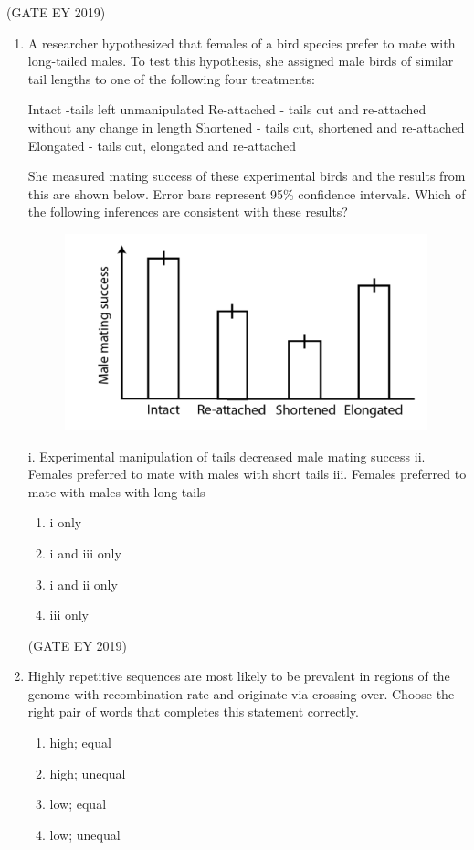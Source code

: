 \documentclass[journal,12pt,onecolumn]{IEEEtran}
\theoremstyle{remark}
\begin{document}
\hfill{(GATE EY 2019)}
\begin{enumerate}[resume]

\item A researcher hypothesized that females of a bird species prefer to mate with long-tailed males. To test this hypothesis, she assigned male birds of similar tail lengths to one of the following four treatments:  

 Intact -tails left unmanipulated  
 Re-attached - tails cut and re-attached without any change in length  
 Shortened - tails cut, shortened and re-attached  
 Elongated - tails cut, elongated and re-attached  

She measured mating success of these experimental birds and the results from this are shown below. Error bars represent 95\% confidence intervals. Which of the following inferences are consistent with these results?  


\begin{figure}[h]
    \centering
    \includegraphics[]{figs/28.png}
\end{figure}

i. Experimental manipulation of tails decreased male mating success  
ii. Females preferred to mate with males with short tails  
iii. Females preferred to mate with males with long tails  
\begin{multicols}{2}
\begin{enumerate}
\item   i only
\item   i and iii only
\item   i and ii only
\item   iii only
\end{enumerate}
\end{multicols}


\hfill{(GATE EY 2019)}
\item Highly repetitive sequences are most likely to be prevalent in regions of the genome with  \underline{\hspace{1.5cm}}recombination rate and originate via  \underline{\hspace{1.5cm}}crossing over. Choose the right pair of words that completes this statement correctly.  
\begin{multicols}{2}
\begin{enumerate}
\item high; equal
\item high; unequal
\item low; equal 
\item low; unequal
\end{enumerate}
\end{multicols}


\end{enumerate}
\end{document}
